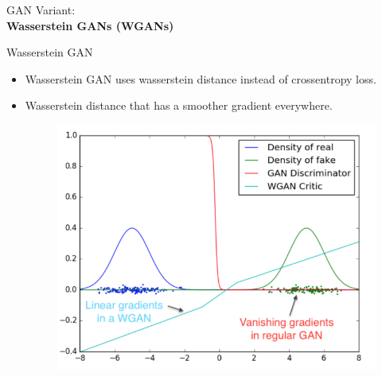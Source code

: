 \begin{frame}{}
    \LARGE GAN Variant: \\[1.5ex] \textbf{Wasserstein GANs (WGANs)}
\end{frame}

\begin{frame}[allowframebreaks]{Wasserstein GAN}
\begin{itemize}
    \item Wasserstein GAN uses wasserstein distance instead of crossentropy loss.
    \item Wasserstein distance that has a smoother gradient everywhere.
        \begin{figure}
            \centering
            \includegraphics[height=0.6\textheight, width=\textwidth, keepaspectratio]{images/gan/wgan_1.png}
        \end{figure}
\end{itemize}
    
\end{frame}

